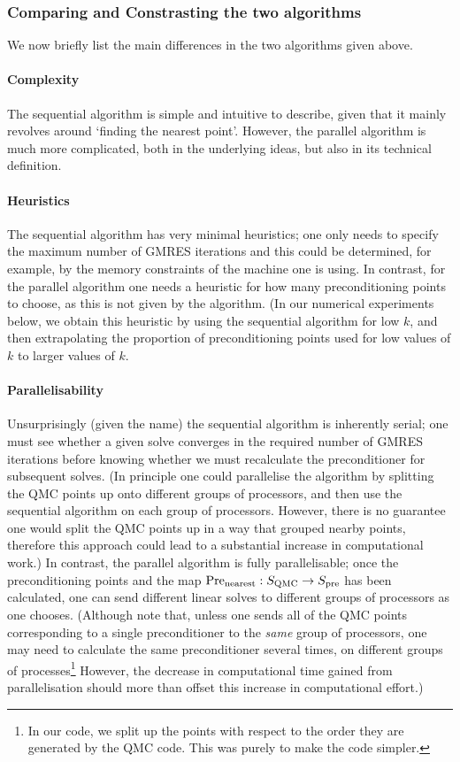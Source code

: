 \subsubsection{Comparing and Constrasting the two algorithms}

We now briefly list the main differences in the two algorithms given above.

\paragraph{Complexity} The sequential algorithm is simple and intuitive to describe, given that it mainly revolves around `finding the nearest point'. However, the parallel algorithm is much more complicated, both in the underlying ideas, but also in its technical definition.

\paragraph{Heuristics} The sequential algorithm has very minimal heuristics; one only needs to specify the maximum number of GMRES iterations and this could be determined, for example, by the memory constraints of the machine one is using. In contrast, for the parallel algorithm one needs a heuristic for how many preconditioning points to choose, as this is not given by the algorithm. (In our numerical experiments below, we obtain this heuristic by using the sequential algorithm for low $k$, and then extrapolating the proportion of preconditioning points used for low values of $k$ to larger values of $k.$

\paragraph{Parallelisability} Unsurprisingly (given the name) the sequential algorithm is inherently serial; one must see whether a given solve converges in the required number of GMRES iterations before knowing whether we must recalculate the preconditioner for subsequent solves. (In principle one could parallelise the algorithm by splitting the QMC points up onto different groups of processors, and then use the sequential algorithm on each group of processors. However, there is no guarantee one would split the QMC points up in a way that grouped nearby points, therefore this approach could lead to a substantial increase in computational work.) In contrast, the parallel algorithm is fully parallelisable; once the preconditioning points and the map $\mathrm{Pre}_{\mathrm{nearest}}:S_{\mathrm{QMC}}\rightarrow S_{\mathrm{pre}}$ has been calculated, one can send different linear solves to different groups of processors as one chooses. (Although note that, unless one sends all of the QMC points corresponding to a single preconditioner to the \emph{same} group of processors, one may need to calculate the same preconditioner several times, on different groups of processes\footnote{In our code, we split up the points with respect to the order they are generated by the QMC code. This was purely to make the code simpler.} However, the decrease in computational time gained from parallelisation should more than offset this increase in computational effort.)

